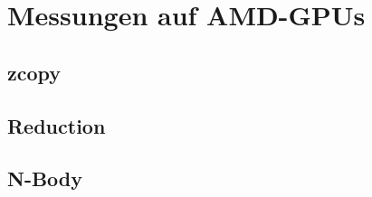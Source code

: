 \section{Messungen auf AMD-GPUs}
\label{amd}

\subsection{zcopy}

\subsection{Reduction}

\subsection{N-Body}
